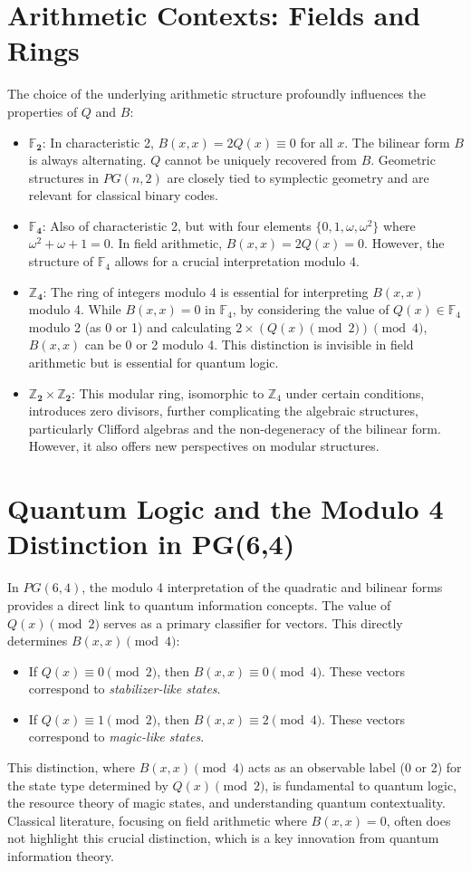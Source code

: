 \documentclass{article}
\begin{document}
\section{Arithmetic Contexts: Fields and Rings}
The choice of the underlying arithmetic structure profoundly influences the properties of $Q$ and $B$:
\begin{itemize}
    \item $\mathbf{\mathbb{F}_2}$: In characteristic 2, $B(x,x) = 2Q(x) \equiv 0$ for all $x$. The bilinear form $B$ is always alternating. $Q$ cannot be uniquely recovered from $B$. Geometric structures in $PG(n,2)$ are closely tied to symplectic geometry and are relevant for classical binary codes.
    \item $\mathbf{\mathbb{F}_4}$: Also of characteristic 2, but with four elements $\{0, 1, \omega, \omega^2\}$ where $\omega^2+\omega+1=0$. In field arithmetic, $B(x,x)=2Q(x)=0$. However, the structure of $\mathbb{F}_4$ allows for a crucial interpretation modulo 4.
    \item $\mathbf{\mathbb{Z}_4}$: The ring of integers modulo 4 is essential for interpreting $B(x,x)$ modulo 4. While $B(x,x)=0$ in $\mathbb{F}_4$, by considering the value of $Q(x) \in \mathbb{F}_4$ modulo 2 (as 0 or 1) and calculating $2 \times (Q(x) \pmod 2) \pmod 4$, $B(x,x)$ can be 0 or 2 modulo 4. This distinction is invisible in field arithmetic but is essential for quantum logic.
    \item $\mathbf{\mathbb{Z}_2 \times \mathbb{Z}_2}$: This modular ring, isomorphic to $\mathbb{Z}_4$ under certain conditions, introduces zero divisors, further complicating the algebraic structures, particularly Clifford algebras and the non-degeneracy of the bilinear form. However, it also offers new perspectives on modular structures.
\end{itemize}

\section{Quantum Logic and the Modulo 4 Distinction in PG(6,4)}
In $PG(6,4)$, the modulo 4 interpretation of the quadratic and bilinear forms provides a direct link to quantum information concepts. The value of $Q(x) \pmod 2$ serves as a primary classifier for vectors. This directly determines $B(x,x) \pmod 4$:
\begin{itemize}
    \item If $Q(x) \equiv 0 \pmod 2$, then $B(x,x) \equiv 0 \pmod 4$. These vectors correspond to \emph{stabilizer-like states}.
    \item If $Q(x) \equiv 1 \pmod 2$, then $B(x,x) \equiv 2 \pmod 4$. These vectors correspond to \emph{magic-like states}.
\end{itemize}
This distinction, where $B(x,x) \pmod 4$ acts as an observable label (0 or 2) for the state type determined by $Q(x) \pmod 2$, is fundamental to quantum logic, the resource theory of magic states, and understanding quantum contextuality. \cite{Havlicek2021Clifford} Classical literature, focusing on field arithmetic where $B(x,x)=0$, often does not highlight this crucial distinction, which is a key innovation from quantum information theory.
\end{document}
